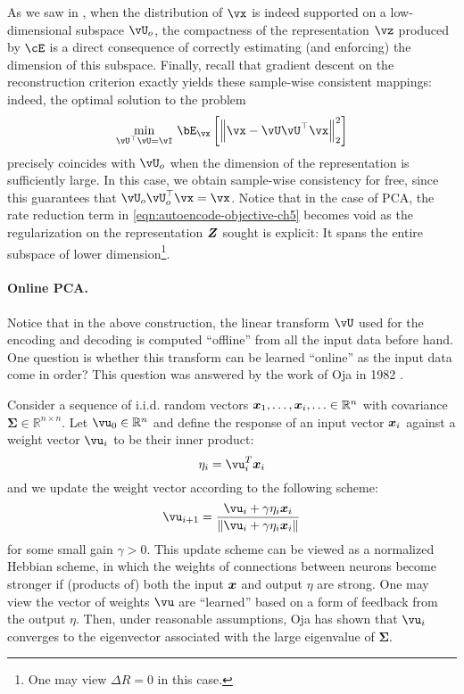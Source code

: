 \documentclass[../../book-main.tex]{subfiles}
\begin{document}
As we saw in , when the distribution of $\vx$ is indeed
supported on a low-dimensional subspace $\vU_o$, the compactness of
the representation
$\vz$ produced by $\cE$ is a direct consequence of correctly
estimating (and enforcing) the dimension of this subspace.  Finally,
recall that gradient descent on the reconstruction criterion exactly
yields these sample-wise consistent mappings: indeed, the optimal
solution to the problem
\begin{equation}\label{eq:pca-reconstruction-ch5}
  \min_{\vU^\top \vU = \vI}\, \bE_{\vx}\left[\norm*{\vx
  - \vU\vU^\top \vx}_2^2\right]
\end{equation}
precisely coincides with $\vU_o$ when the dimension of the representation is
sufficiently large. In this case, we obtain sample-wise consistency
for free, since this guarantees that $\vU_o\vU_o^\top \vx = \vx$.
Notice that in the case of PCA, the rate reduction term in
\eqref{eqn:autoencode-objective-ch5} becomes void as the regularization
on the representation $\bm{Z}$ sought is explicit: It spans the entire
subspace of lower dimension\footnote{One may view $\Delta R = 0$ in this case.}.

\paragraph{Online PCA.} Notice that in the above construction, the
linear transform $\vU$
used for the encoding and decoding is computed ``offline'' from all
the input data before hand. One question is whether this transform
can be learned ``online'' as the input data come in order? This
question was answered by the work of Oja in 1982 \cite{Oja1982SimplifiedNM}.
\begin{example} Consider a
  sequence of i.i.d. random vectors $\bm{x}_1, \ldots, \bm{x}_i, \ldots \in
  \mathbb{R}^n$ with covariance $\boldsymbol{\Sigma} \in
  \mathbb{R}^{n\times n}$. Let $\vu_0 \in \mathbb{R}^n$ and define
  the response of an input vector $\bm{x}_i$ against a weight vector
  $\vu_i$ to be their inner product:
  \begin{equation}
    \eta_i = \vu_i^T \x_i
  \end{equation}
  and we update the weight vector according to the following scheme:
  \begin{equation}
    \vu_{i+1} = \frac{\vu_i + \gamma \eta_i \x_i}{\|\vu_i + \gamma
    \eta_i \x_i\|}
    \label{eqn:Hebbian}
  \end{equation}
  for some small gain $\gamma >0$. This update scheme can be viewed
  as a normalized Hebbian scheme, in which the weights of connections
  between neurons become stronger if (products of) both the input
  $\bm{x}$ and output $\eta$ are strong. One may view the vector of
  weights $\vu$ are ``learned'' based on a form of feedback from the
  output $\eta$.
  Then, under reasonable assumptions, Oja \cite{Oja1982SimplifiedNM} has 
  shown that $\vu_i$ converges to the eigenvector associated with
  the large eigenvalue of $\boldsymbol{\Sigma}$.
\end{example}
\end{document}
